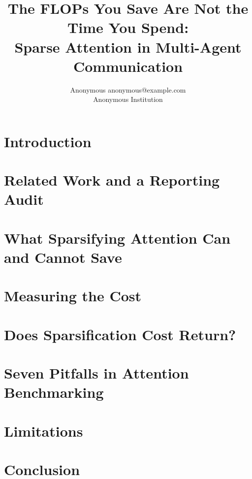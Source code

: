 \documentclass[10pt]{article} %
\title{The FLOPs You Save Are Not the Time You Spend:\\
Sparse Attention in Multi-Agent Communication}
\author{\name Anonymous \email anonymous@example.com \\
      \addr Anonymous Institution}
\begin{document}
\maketitle

\begin{abstract}

\end{abstract}

\section{Introduction}
\label{sec:intro}


\section{Related Work and a Reporting Audit}
\label{sec:related}


\section{What Sparsifying Attention Can and Cannot Save}
\label{sec:analysis}


\section{Measuring the Cost}
\label{sec:measurement}


\section{Does Sparsification Cost Return?}
\label{sec:training}


\section{Seven Pitfalls in Attention Benchmarking}
\label{sec:pitfalls}


\section{Limitations}
\label{sec:limitations}


\section{Conclusion}
\label{sec:conclusion}

\end{document}
